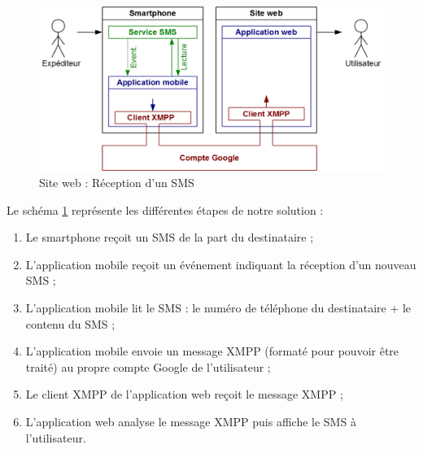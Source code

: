 \begin{figure}[!h]
	\center
	\includegraphics[scale=0.5]{img/schemaFonctionnement_siteWeb_reception.png}
	\caption{Site web : Réception d'un SMS}
	\label{schemaFonctionnement_siteWeb_reception}
\end{figure}
Le schéma \ref{schemaFonctionnement_siteWeb_reception} représente les différentes étapes de notre solution :
\begin{enumerate}
	\item Le smartphone reçoit un SMS de la part du destinataire ;
	\item L'application mobile reçoit un événement indiquant la réception d'un nouveau SMS ;
	\item L'application mobile lit le SMS : le numéro de téléphone du destinataire + le contenu du SMS ;
	\item L'application mobile envoie un message XMPP (formaté pour pouvoir être traité) au propre compte Google de l'utilisateur ;
	\item Le client XMPP de l'application web reçoit le message XMPP ;
	\item L'application web analyse le message XMPP puis affiche le SMS à l'utilisateur.
\end{enumerate}